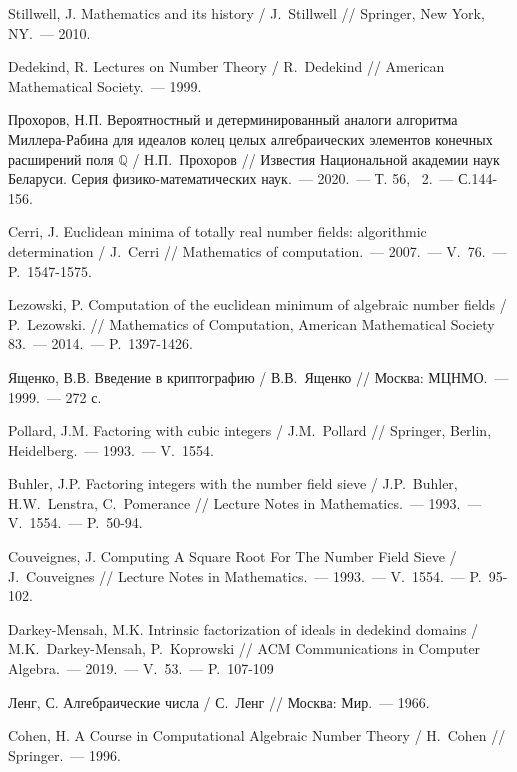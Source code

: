 \documentclass[_00_dissertation.tex]{subfiles}
\begin{document}
\begin{thebibliography}{99}
    Stillwell, J. Mathematics and its history / J.~Stillwell // Springer, New York, NY.~--- 2010.

    Dedekind, R. Lectures on Number Theory / R.~Dedekind // American Mathematical Society.~--- 1999.

    Прохоров, Н.П. Вероятностный и детерминированный аналоги алгоритма Миллера-Рабина для идеалов колец целых алгебраических элементов конечных расширений поля $\mathbb{Q}$ / Н.П.~Прохоров // Известия Национальной академии наук Беларуси. Серия физико-математических наук.~--- 2020.~--- Т. 56, \textnumero~2.~--- С.144-156.

    Cerri, J. Euclidean minima of totally real number fields: algorithmic determination / J.~Cerri // Mathematics of computation.~--- 2007.~--- V.~76.~--- P.~1547-1575.

    Lezowski, P. Computation of the euclidean minimum of algebraic number fields / P.~Lezowski. // Mathematics of Computation, American Mathematical Society 83.~--- 2014.~--- P.~1397-1426.

    Ященко, В.В. Введение в криптографию / В.В.~Ященко // Москва: МЦНМО.~--- 1999.~--- 272 с.
    
    Pollard, J.M. Factoring with cubic integers / J.M.~Pollard // Springer, Berlin, Heidelberg.~--- 1993.~--- V.~1554.

    Buhler, J.P. Factoring integers with the number field sieve / J.P.~Buhler, H.W.~Lenstra, C.~Pomerance // Lecture Notes in Mathematics.~--- 1993.~--- V.~1554.~--- P.~50-94.

    Couveignes, J. Computing A Square Root For The Number Field Sieve / J.~Couveignes // Lecture Notes in Mathematics.~--- 1993.~--- V.~1554.~--- P.~95-102.

    Darkey-Mensah, M.K. Intrinsic factorization of ideals in dedekind domains / M.K.~Darkey-Mensah, P.~Koprowski // ACM Communications in Computer Algebra.~--- 2019.~--- V.~53.~--- P.~107-109

    Ленг, С. Алгебраические числа / С.~Ленг // Москва: Мир.~--- 1966.

    Cohen, H. A Course in Computational Algebraic Number Theory / H.~Cohen // Springer.~--- 1996.


\end{thebibliography}
\end{document}
